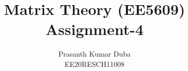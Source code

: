 \documentclass[journal,12pt,twocolumn]{IEEEtran}
\begin{document}
\makeatletter
{}
\makeatother
\let\StandardTheFigure\thefigure
\let\vec\mathbf
\renewcommand{\thefigure}{\theproblem}
\def\putbox#1#2#3{\makebox[0in][l]{\makebox[#1][l]{}\raisebox{\baselineskip}[0in][0in]{\raisebox{#2}[0in][0in]{#3}}}}
     \def\rightbox#1{\makebox[0in][r]{#1}}
     \def\centbox#1{\makebox[0in]{#1}}
     \def\topbox#1{\raisebox{-\baselineskip}[0in][0in]{#1}}
     \def\midbox#1{\raisebox{-0.5\baselineskip}[0in][0in]{#1}}
\vspace{3cm}
\title{Matrix Theory (EE5609) \\ Assignment-4}
\author{Prasanth Kumar Duba \\ EE20RESCH11008}
%
%
%
% 
%
\end{document}
